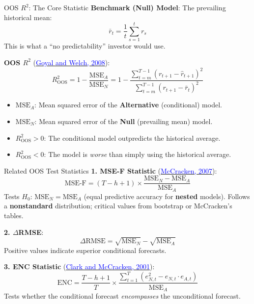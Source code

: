 \documentclass{beamer}
\begin{document}
\begin{frame}{OOS $R^2$: The Core Statistic}
    \textbf{Benchmark (Null) Model}: The prevailing historical mean:
    \begin{equation}
        \bar{r}_{t} = \frac{1}{t} \sum_{s=1}^{t} r_s
    \end{equation}
    This is what a ``no predictability'' investor would use.

    \vspace{0.3cm}
    \textbf{OOS $R^2$} (\href{https://doi.org/10.1093/rfs/hhm014}{\textcolor{blue}{Goyal and Welch, 2008}}):
    \begin{equation}
        R^2_{\text{OOS}} = 1 - \frac{\text{MSE}_A}{\text{MSE}_N} = 1 - \frac{\sum_{t=m}^{T-1}(r_{t+1} - \hat{r}_{t+1})^2}{\sum_{t=m}^{T-1}(r_{t+1} - \bar{r}_{t})^2}
    \end{equation}
    \begin{itemize}
        \item $\text{MSE}_A$: Mean squared error of the \textbf{Alternative} (conditional) model.
        \item $\text{MSE}_N$: Mean squared error of the \textbf{Null} (prevailing mean) model.
        \item $R^2_{\text{OOS}} > 0$: The conditional model outpredicts the historical average.
        \item $R^2_{\text{OOS}} < 0$: The model is \textit{worse} than simply using the historical average.
    \end{itemize}
\end{frame}

\begin{frame}{Related OOS Test Statistics}
    \textbf{1. MSE-F Statistic} (\href{https://doi.org/10.1016/j.jeconom.2006.07.020}{\textcolor{blue}{McCracken, 2007}}):
    \begin{equation}
        \text{MSE-F} = (T - h + 1) \times \frac{\text{MSE}_N - \text{MSE}_A}{\text{MSE}_A}
    \end{equation}
    Tests $H_0$: $\text{MSE}_N = \text{MSE}_A$ (equal predictive accuracy for \textbf{nested} models). Follows a \textbf{nonstandard} distribution; critical values from bootstrap or McCracken's tables.

    \vspace{0.3cm}
    \textbf{2. $\Delta$RMSE}:
    \begin{equation}
        \Delta\text{RMSE} = \sqrt{\text{MSE}_N} - \sqrt{\text{MSE}_A}
    \end{equation}
    Positive values indicate superior conditional forecasts.

    \vspace{0.3cm}
    \textbf{3. ENC Statistic} (\href{https://doi.org/10.1016/S0304-4076(01)00071-9}{\textcolor{blue}{Clark and McCracken, 2001}}):
    \begin{equation}
        \text{ENC} = \frac{T - h + 1}{T} \times \frac{\sum_{t=1}^{T}\left(e_{N,t}^2 - e_{N,t} \cdot e_{A,t}\right)}{\text{MSE}_A}
    \end{equation}
    Tests whether the conditional forecast \textit{encompasses} the unconditional forecast.
\end{frame}
\end{document}
